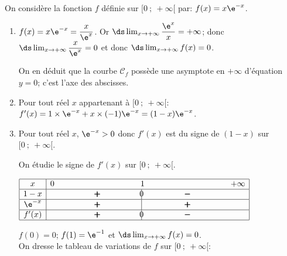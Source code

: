 \medskip

On considère la fonction $f$ définie sur $[0~;~ +\infty[$ par: $f(x) = x\e^{-x}$.









\begin{enumerate}
\item 



$f(x)=x \e^{-x}=\dfrac{x}{\e^{x}}$.
Or $\ds\lim_{x\to +\infty} \dfrac{\e^{x}}{x}=+\infty$; 
donc $\ds\lim_{x\to +\infty} \dfrac{x}{\e^{x}} =0$ et donc  $\ds\lim_{x\to +\infty} f(x)=0$.

On en déduit que la courbe $\mathcal{C}_f$ possède une asymptote en $+ \infty$ d'équation $y=0$; c'est l'axe des abscisses.

\item Pour tout réel $x$ appartenant à $[0~;~ +\infty[$:
$f'(x)=1\times \e^{-x}+x\times (-1)\e^{-x}=(1-x)\e^{-x}$.

\item 

Pour tout réel $x$, $\e^{-x}>0$ donc $f'(x)$ est du signe de $(1-x)$ sur $[0~;~ +\infty[$.

On étudie le signe de $f'(x)$ sur $[0~;~ +\infty[$.

\begin{center}
{\renewcommand{\arraystretch}{1.5}
\def\esp{\hspace*{3cm}}
$\begin{array}{|c | *{5}{c} |} 
\hline
x  & 0 & \esp & 1 & \esp  & +\infty \\
\hline
1-x &  & \pmb{+} &  \vline\hspace{-2.7pt}{0} & \pmb{-} &   \\
\hline
\e^{-x} &  & \pmb{+} &  \vline\hspace{-2.7pt}{\phantom 0} & \pmb{+} &   \\
\hline
f'(x) &  & \pmb{+} &  \vline\hspace{-2.7pt}{0} & \pmb{-} &   \\
\hline
\end{array}$
}
\end{center}

$f(0)=0$; $f(1)=\e^{-1}$ et $\ds\lim_{x\to +\infty} f(x)=0$.\\
On dresse le tableau de variations de $f$ sur  $[0~;~ +\infty[$:


\end{enumerate}
